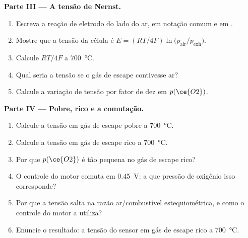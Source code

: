 \begin{problem}
\medskip\noindent\textbf{Parte III --- A tensão de Nernst.}
\begin{enumerate}[resume]
  \item Escreva a reação de eletrodo do lado do ar, em notação comum e em
        .
  \item Mostre que a tensão da célula é $E = (RT/4F)\ln\bigl(p_{\mathrm{air}}/p_{\mathrm{exh}}\bigr)$.
  \item Calcule $RT/4F$ a \qty{700}{\celsius}.
  \item Qual seria a tensão se o gás de escape contivesse ar?
  \item Calcule a variação de tensão por fator de dez em $p(\ce{O2})$.
\end{enumerate}

\medskip\noindent\textbf{Parte IV --- Pobre, rico e a comutação.}
\begin{enumerate}[resume]
  \item Calcule a tensão em gás de escape pobre a \qty{700}{\celsius}.
  \item Calcule a tensão em gás de escape rico a \qty{700}{\celsius}.
  \item Por que $p(\ce{O2})$ é tão pequena no gás de escape rico?
  \item O controle do motor comuta em \qty{0.45}{V}: a que pressão de oxigênio isso
        corresponde?
  \item Por que a tensão salta na razão ar/combustível estequiométrica, e como
        o controle do motor a utiliza?
  \item Enuncie o resultado: a tensão do sensor em gás de escape rico a \qty{700}{\celsius}.
\end{enumerate}
\end{problem}
